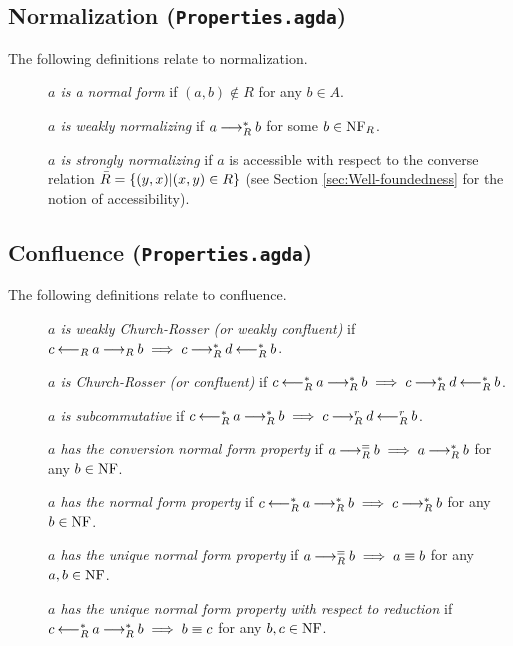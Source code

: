 \subsection{Normalization (\texttt{Properties.agda})}
\begin{definition} The following definitions relate to normalization. 
  \begin{description}
    \item[] \emph{$a$ is a normal form} if $(a,b) \notin R$ for any $b \in A$.
    \item[] \emph{$a$ is weakly normalizing} if $a \mathbin{\longrightarrow_R^*} b$ for some $b \in \mathrm{NF}_R$.
    \item[] \emph{$a$ is strongly normalizing} if $a$ is accessible with respect to the converse relation $\bar{R} = \left\{(y,x) | (x,y) \in R\right\}$ 
    (see Section \ref{sec:Well-foundedness} for the notion of accessibility).
  \end{description}
\end{definition}



\subsection{Confluence (\texttt{Properties.agda})}
\begin{definition} The following definitions relate to confluence.
    \begin{description}
        \item[] \emph{$a$ is weakly Church-Rosser (or weakly confluent)} if $c \mathbin{\longleftarrow_R} a \mathbin{\longrightarrow_R} b \implies c \mathbin{\longrightarrow_R^*} d \mathbin{\longleftarrow_R^*} b$.
        \item[] \emph{$a$ is Church-Rosser (or confluent)} if $c \mathbin{\longleftarrow_R^*} a \mathbin{\longrightarrow_R^*} b \implies c \mathbin{\longrightarrow_R^*} d \mathbin{\longleftarrow_R^*} b$.
        \item[] \emph{$a$ is subcommutative} if $c \mathbin{\longleftarrow_R^*} a \mathbin{\longrightarrow_R^*} b \implies c \mathbin{\longrightarrow_R^r} d \mathbin{\longleftarrow_R^r} b$.
        \item[] \emph{$a$ has the conversion normal form property} if $a \mathbin{\longrightarrow_R^=} b \implies a\mathbin{\longrightarrow_R^*} b$ for any $b \in \mathrm{NF}$.
        \item[] \emph{$a$ has the normal form property} if $c \mathbin{\longleftarrow_R^*} a \mathbin{\longrightarrow_R^*} b \implies c \mathbin{\longrightarrow_R^*} b$ for any $b \in \mathrm{NF}$.
        \item[] \emph{$a$ has the unique normal form property} if $a \mathbin{\longrightarrow_R^=} b \implies a \equiv b$  for any $a, b \in \mathrm{NF}$.
        \item[] \emph{$a$ has the unique normal form property with respect to reduction} if $c \mathbin{\longleftarrow_R^*} a \mathbin{\longrightarrow_R^*} b  \implies b \equiv c$  for any $b, c \in \mathrm{NF}$.
    \end{description}
\end{definition}

